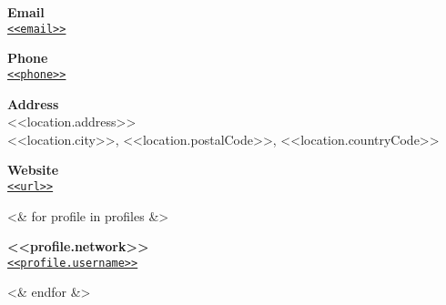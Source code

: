 
\begin{cvitem}[Envelope][4]
    \textbf{Email}\\
    \href{mailto:<<email>>}{\texttt{<<email>>}}
\end{cvitem}

\cvseparator[3]
\begin{cvitem}[Phone][4]
    \textbf{Phone}\\
    \href{tel:<<phone>>}{\texttt{<<phone>>}}
\end{cvitem}

\cvseparator[3]
\begin{cvitem}[Home][4]
    \textbf{Address}\\
    <<location.address>>\\
    <<location.city>>, <<location.postalCode>>, <<location.countryCode>>
\end{cvitem}

\cvseparator[3]
\begin{cvitem}[Globe][4]
    \textbf{Website}\\
    \href{<<url>>}{\texttt{<<url>>}}
\end{cvitem}


<& for profile in profiles &>

\cvseparator[3]
\begin{cvitem}
    \textbf{<<profile.network>>}\\
    \href{<<profile.url>>}{\texttt{<<profile.username>>}}
\end{cvitem}

<& endfor &>

